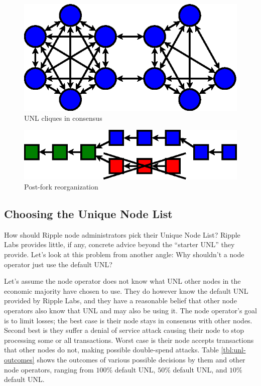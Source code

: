 \documentclass{article}
\begin{document}
\begin{figure}
    \centering
    \includegraphics{figures/unl-clique-consensus.eps}
    \caption{UNL cliques in consensus}
    \label{fig:unl-clique-consensus}
\end{figure}

\begin{figure}
    \centering
    \includegraphics{figures/unl-clique-reorganized-blockchain.eps}
    \caption{Post-fork reorganization}
    \label{fig:unl-clique-post-fork}
\end{figure}


\subsection{Choosing the Unique Node List}

How should Ripple node administrators pick their Unique Node List? Ripple Labs
provides little, if any, concrete advice beyond the ``starter UNL'' they
provide. Let's look at this problem from another angle: Why shouldn't a node
operator just use the default UNL?

Let's assume the node operator does not know what UNL other nodes in the
economic majority have chosen to use. They do however know the default UNL
provided by Ripple Labs, and they have a reasonable belief that other node
operators also know that UNL and may also be using it. The node operator's goal
is to limit losses; the best case is their node stays in consensus with other
nodes. Second best is they suffer a denial of service attack causing their node
to stop processing some or all transactions. Worst case is their node accepts
transactions that other nodes do not, making possible double-spend attacks.
Table \ref{tbl:unl-outcomes} shows the outcomes of various possible
decisions by them and other node operators, ranging from $100\%$ default UNL,
$50\%$ default UNL, and $10\%$ default UNL.
\end{document}
